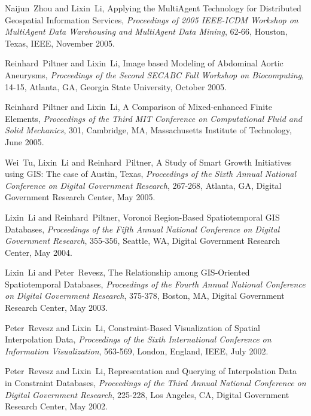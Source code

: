 \documentclass[10pt]{article}
\begin{document}
\begin{bibenum}
\item Naijun~Zhou and Lixin~Li, Applying the MultiAgent Technology
for Distributed Geospatial Information Services, {\it Proceedings
of 2005 IEEE-ICDM Workshop on MultiAgent Data Warehousing and
MultiAgent Data Mining}, 62-66, Houston, Texas, IEEE, November
2005.

\item Reinhard~Piltner and Lixin~Li, Image based Modeling of
Abdominal Aortic Aneurysms, {\it Proceedings of the Second SECABC
Fall Workshop on Biocomputing}, 14-15, Atlanta, GA, Georgia State
University, October 2005.

\item Reinhard~Piltner and Lixin~Li, A Comparison of
Mixed-enhanced Finite Elements, {\it Proceedings of the Third MIT
Conference on Computational Fluid and Solid Mechanics}, 301,
Cambridge, MA, Massachusetts Institute of Technology, June 2005.

\item Wei~Tu, Lixin~Li and Reinhard~Piltner, A Study of Smart
Growth Initiatives using GIS: The case of Austin, Texas, {\it
Proceedings of the Sixth Annual National Conference on Digital
Government Research}, 267-268, Atlanta, GA, Digital Government
Research Center, May 2005.

\item Lixin~Li and Reinhard~Piltner, Voronoi Region-Based
Spatiotemporal GIS Databases, {\it Proceedings of the Fifth Annual
National Conference on Digital Government Research}, 355-356,
Seattle, WA, Digital Government Research Center, May 2004.

\item Lixin~Li and Peter~Revesz, The Relationship among
GIS-Oriented Spatiotemporal Databases, {\it Proceedings of the
Fourth Annual National Conference on Digital Government Research},
375-378, Boston, MA, Digital Government Research Center, May 2003.

\item Peter~Revesz and Lixin~Li, Constraint-Based Visualization of
Spatial Interpolation Data, {\it Proceedings of the Sixth
International Conference on Information Visualization}, 563-569,
London, England, IEEE, July 2002.

\item Peter~Revesz and Lixin~Li, Representation and Querying of
Interpolation Data in Constraint Databases, {\it Proceedings of
the Third Annual National Conference on Digital Government
Research}, 225-228, Los Angeles, CA, Digital Government Research
Center, May 2002.

\end{bibenum}
\end{document}
